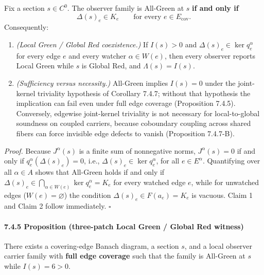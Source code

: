 \documentclass[
  11pt,
]{article}
\providecommand{\tightlist}{%
  \setlength{\itemsep}{0pt}\setlength{\parskip}{0pt}}
\providecommand{\tightlist}{%
  \setlength{\itemsep}{0pt}\setlength{\parskip}{0pt}}
\begin{document}
Fix a section \(s\in C^0\). The observer family is All-Green at \(s\) \textbf{if and only if}
\[
\Delta(s)_e\in K_e
\qquad\text{for every } e\in E_{\mathrm{cov}} .
\]
Consequently:

\begin{enumerate}
\def\labelenumi{\arabic{enumi}.}
\tightlist
\item
  \emph{(Local Green / Global Red coexistence.)} If \(I(s)>0\) and \(\Delta(s)_e\in\ker q_e^\alpha\) for every edge \(e\) and every watcher \(\alpha\in W(e)\), then every observer reports Local Green while \(s\) is Global Red, and \(\Lambda(s)=I(s)\).
\item
  \emph{(Sufficiency versus necessity.)} All-Green implies \(I(s)=0\) under the joint-kernel triviality hypothesis of Corollary 7.4.7; without that hypothesis the implication can fail even under full edge coverage (Proposition 7.4.5). Conversely, edgewise joint-kernel triviality is not necessary for local-to-global soundness on coupled carriers, because coboundary coupling across shared fibers can force invisible edge defects to vanish (Proposition 7.4.7-B).
\end{enumerate}

\emph{Proof.} Because \(J^\alpha(s)\) is a finite sum of nonnegative norms, \(J^\alpha(s)=0\) if and only if \(q_e^\alpha(\Delta(s)_e)=0\), i.e., \(\Delta(s)_e\in\ker q_e^\alpha\), for all \(e\in E^\alpha\). Quantifying over all \(\alpha\in A\) shows that All-Green holds if and only if \(\Delta(s)_e\in\bigcap_{\alpha\in W(e)}\ker q_e^\alpha=K_e\) for every watched edge \(e\), while for unwatched edges (\(W(e)=\varnothing\)) the condition \(\Delta(s)_e\in F(a_e)=K_e\) is vacuous. Claim 1 and Claim 2 follow immediately. \(\square\)

\paragraph{7.4.5 Proposition (three-patch Local Green / Global Red witness)}\label{proposition-three-patch-local-green-global-red-witness}

There exists a covering-edge Banach diagram, a section \(s\), and a local observer carrier family with \textbf{full edge coverage} such that the family is All-Green at \(s\) while \(I(s)=6>0\).
\end{document}
